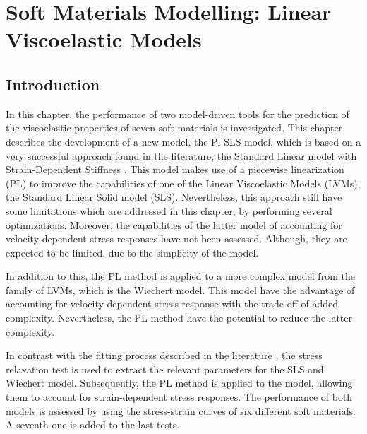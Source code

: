 \chapter{Soft Materials Modelling: Linear Viscoelastic Models} \label{sec:ChapterModellingLVM}


\section{Introduction}

In this chapter, the performance of two model-driven tools for the prediction of the viscoelastic properties of seven soft materials is investigated. This chapter describes the development of a new model, the Pl-SLS model, which is based on a very successful approach found in the literature, the Standard Linear model with Strain-Dependent Stiffness \cite{austin2015control}. This model makes use of a piecewise linearization (PL) to improve the capabilities of one of the Linear Viscoelastic Models (LVMs), the Standard Linear Solid model (SLS). Nevertheless, this approach still have some limitations which are addressed in this chapter, by performing several optimizations. Moreover, the capabilities of the latter model of accounting for velocity-dependent stress responses have not been assessed. Although, they are expected to be limited, due to the simplicity of the model.

In addition to this, the PL method is applied to a more complex model from the family of LVMs, which is the Wiechert model. This model have the advantage of accounting for velocity-dependent stress response with the trade-off of added complexity. Nevertheless, the PL method have the potential to reduce the latter complexity.

In contrast with the fitting process described in the literature \cite{austin2015control}, the stress relaxation test is used to extract the relevant parameters for the SLS and Wiechert model. Subsequently, the PL method is applied to the model, allowing them to account for strain-dependent stress responses. The performance of both models is assessed by using the stress-strain curves of six different soft materials. A seventh one is added to the last tests.

